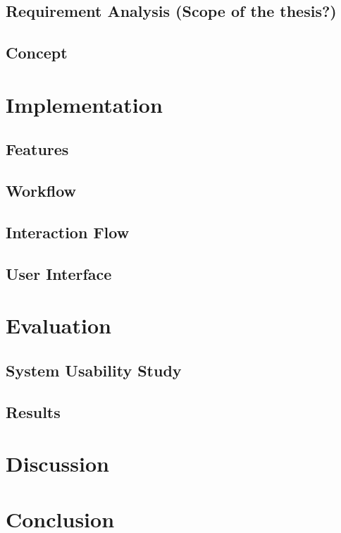 \documentclass[twoside, parskip]{VRThesis} %
\begin{document}
\section{\label{sec::RequirementAnalysis}Requirement Analysis (Scope of the thesis?)}

\section{\label{sec::Concept}Concept}


\chapter{\label{chap::Implementation}Implementation}

\section{\label{sec::Features}Features}

\section{\label{sec::Workflow}Workflow}

\section{\label{sec::InteractionFlow}Interaction Flow}

\section{\label{sec::UserInterface}User Interface}


\chapter{\label{chap::Evaluation}Evaluation}

\section{\label{sec::Methology}System Usability Study}

\section{\label{sec::Results}Results}


\chapter{\label{chap::Discussion}Discussion}


\chapter{\label{chap::Conclusion}Conclusion}



%

\end{document}
